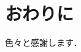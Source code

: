 \documentclass[12pt,uplatex]{jsarticle}   %
\begin{document}
\section{おわりに}



\acknowledgements
色々と感謝します．




%
\end{document}
